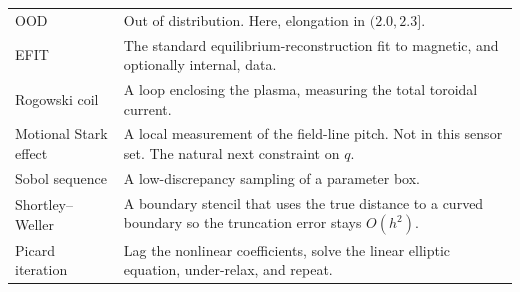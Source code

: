 \documentclass[11pt,a4paper,oneside,openany]{book}
\numberwithin{equation}{chapter}
\theoremstyle{definition}
\begin{document}
\begin{longtable}{@{}>{\raggedright\arraybackslash}p{} >{\raggedright\arraybackslash}p{}@{}}
OOD & Out of distribution. Here, elongation in \((2.0,2.3]\). \\
EFIT & The standard equilibrium-reconstruction fit to magnetic, and optionally internal, data. \\
Rogowski coil & A loop enclosing the plasma, measuring the total toroidal current. \\
Motional Stark effect & A local measurement of the field-line pitch. Not in this sensor set. The natural next constraint on \(q\). \\
Sobol sequence & A low-discrepancy sampling of a parameter box. \\
Shortley--Weller & A boundary stencil that uses the true distance to a curved boundary so the truncation error stays \(O(h^{2})\). \\
Picard iteration & Lag the nonlinear coefficients, solve the linear elliptic equation, under-relax, and repeat. \\
\end{longtable}
\normalsize
\end{document}
